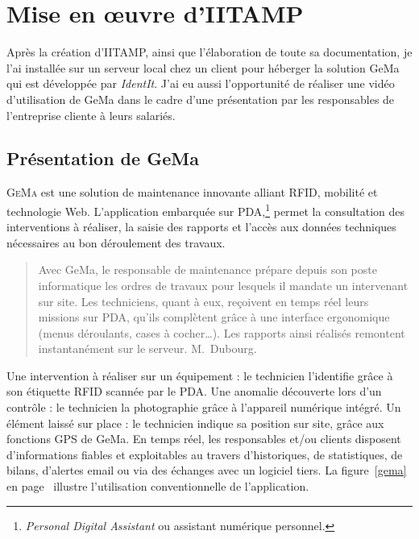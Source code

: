 \chapter{Mise en \oe{}uvre d'IITAMP} %
\label{cha:Mise en oeuvre d'IITAMP}

\begin{it}

Après la création d'IITAMP, ainsi que l'élaboration de toute sa
documentation, je l'ai installée sur un serveur local chez un client
pour héberger la solution GeMa qui est développée par \emph{IdentIt}.
J'ai eu aussi l'opportunité de réaliser une vidéo d'utilisation de GeMa
dans le cadre d'une présentation par les responsables de l'entreprise
cliente à leurs salariés.

\end{it}

\section{Présentation de GeMa} %
\label{sec:Présentation de GeMa}

\lettrine{G}{eMa} est une solution de maintenance innovante alliant
RFID, mobilité et technologie Web. L'application embarquée sur
PDA,\footnote{\emph{Personal Digital Assistant} ou assistant numérique
personnel.} permet la consultation des interventions à réaliser, la
saisie des rapports et l'accès aux données techniques nécessaires au bon
déroulement des travaux.

\begin{quotation}

\og{}Avec GeMa, le responsable de maintenance prépare depuis son poste
informatique les ordres de travaux pour lesquels il mandate un
intervenant sur site. Les techniciens, quant à eux, reçoivent en temps
réel leurs missions sur PDA, qu'ils complètent grâce à une interface
ergonomique (menus déroulants, cases à cocher\dots). Les rapports ainsi
réalisés remontent instantanément sur le serveur. \fg{} M.~Dubourg.

\end{quotation}

Une intervention à réaliser sur un équipement : le technicien
l'identifie grâce à son étiquette RFID scannée par le PDA. Une anomalie
découverte lors d'un contrôle : le technicien la photographie grâce à
l'appareil numérique intégré. Un élément laissé sur place : le
technicien indique sa position sur site, grâce aux fonctions GPS de
GeMa. En temps réel, les responsables et/ou clients disposent
d'informations fiables et exploitables au travers d'historiques, de
statistiques, de bilans, d'alertes email ou via des échanges avec un
logiciel tiers. La figure~\ref{gema} en page~\pageref{gema} illustre
l'utilisation conventionnelle de l'application.

